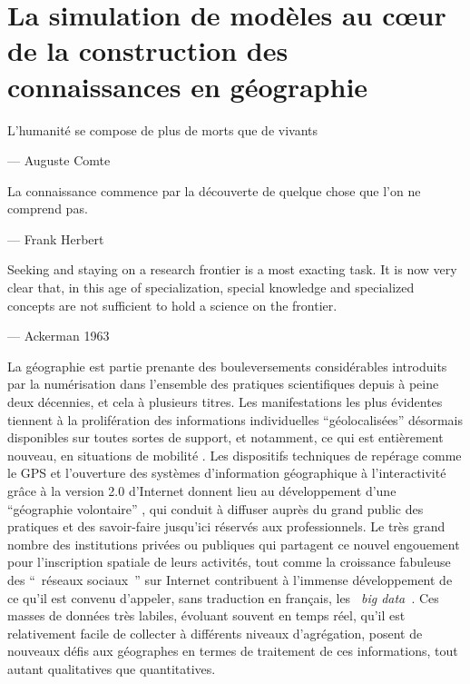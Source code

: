 \graphicspath{{FigureIntroduction/}}

\chapter{La simulation de modèles au cœur de la construction des connaissances en géographie}

\startcontents[chapters]
\Mprintcontents


\epigraph {L'humanité se compose de plus de morts que de vivants } { --- \textup{Auguste Comte}}

\epigraph {La connaissance commence par la découverte de quelque chose que l'on ne comprend pas.  } { --- \textup{Frank Herbert}}

\epigraph {Seeking and staying on a research frontier is a most exacting task. It is now very clear that, in this age of specialization, special knowledge and specialized concepts are not sufficient to hold a science on the frontier.}{ --- \textup{Ackerman 1963}}


La géographie est partie prenante des bouleversements considérables introduits par la numérisation dans l’ensemble des pratiques scientifiques depuis à peine deux décennies, et cela à plusieurs titres. Les manifestations les plus évidentes tiennent à la prolifération des informations individuelles \enquote{géolocalisées} désormais disponibles sur toutes sortes de support, et notamment, ce qui est entièrement nouveau, en situations de mobilité \autocite{FenChong2012}. Les dispositifs techniques de repérage comme le GPS et l’ouverture des systèmes d’information géographique à l’interactivité grâce à la version 2.0 d’Internet donnent lieu au développement d’une \enquote{géographie volontaire} \autocite{Goodchild2007}, qui conduit à diffuser auprès du grand public des pratiques et des savoir-faire jusqu’ici réservés aux professionnels. Le très grand nombre des institutions privées ou publiques qui partagent ce nouvel engouement pour l’inscription spatiale de leurs activités, tout comme la croissance fabuleuse des \enquote{ réseaux sociaux } sur Internet  contribuent à l’immense développement de ce qu’il est convenu d’appeler, sans traduction en français, les \textit{ big data }. Ces masses de données très labiles, évoluant souvent en temps réel, qu’il est relativement facile de collecter à différents niveaux d’agrégation, posent de nouveaux défis aux géographes en termes de traitement de ces informations, tout autant qualitatives que quantitatives. 

